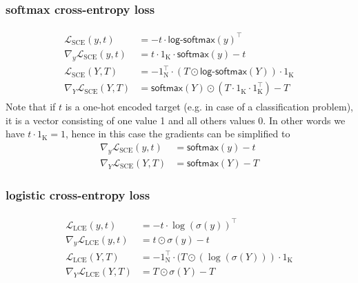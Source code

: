 \documentclass{article}
\newcommand{\const}[1]{\ensuremath{\mathrm{#1}}} %
\newcommand{\func}[1]{\ensuremath{\textsf{#1}}} %
\begin{document}
\subsubsection*{softmax cross-entropy loss}
\begin{align}
\begin{split}
  \mathcal{L}_\text{SCE}(y, t) &= - t \cdot \func{log-softmax}(y)^\top
  \\
  \nabla_y \mathcal{L}_\text{SCE}(y, t) &= t \cdot 1_\const{K} \cdot \func{softmax}(y) - t
  \\
  \mathcal{L}_\text{SCE}(Y, T) &= - 1_\const{N}^\top \cdot (T \odot \func{log-softmax}(Y)) \cdot 1_\const{K}
  \\
  \nabla_Y \mathcal{L}_\text{SCE}(Y, T) &= \func{softmax}(Y) \odot (T \cdot 1_\const{K} \cdot 1_\const{K}^\top) - T
\end{split}
\end{align}
Note that if $t$ is a one-hot encoded target (e.g. in case of a classification problem),
it is a vector consisting of one value 1 and all others values 0. In other words
we have $t \cdot 1_\const{K} = 1$, hence in this case the gradients can be simplified to
\begin{align*}
  \nabla_y \mathcal{L}_\text{SCE}(y, t) &= \func{softmax}(y) - t \\
  \nabla_Y \mathcal{L}_\text{SCE}(Y, T) &= \func{softmax}(Y) - T
\end{align*}

\subsubsection*{logistic cross-entropy loss}
\begin{align}
  \begin{split}
  \label{eq:logistic-cross-entropy-loss}
  \mathcal{L}_\text{LCE}(y, t) &= - t \cdot \log(\sigma(y))^\top
  \\
  \nabla_y \mathcal{L}_\text{LCE}(y, t) &= t \odot \sigma(y) - t
  \\
  \mathcal{L}_\text{LCE}(Y, T) &= - 1_\const{N}^\top \cdot (T \odot (\log(\sigma(Y))) \cdot 1_\const{K}
  \\
  \nabla_Y \mathcal{L}_\text{LCE}(Y, T) &= T \odot \sigma(Y) - T
  \end{split}
\end{align}
\end{document}
